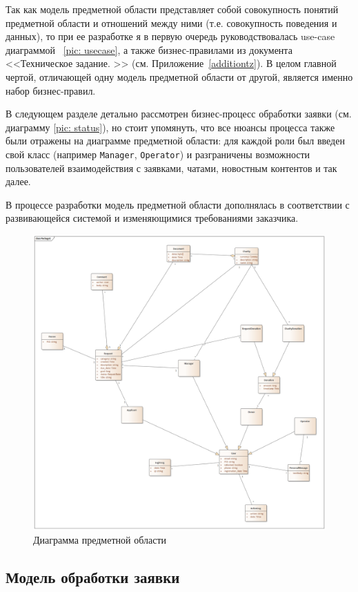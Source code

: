 \documentclass[a4paper,12pt,reqno]{article}
\begin{document}
Так как модель предметной области представляет собой совокупность понятий предметной области и отношений между ними (т.е. совокупность поведения и данных), то при ее разработке я в первую очередь руководствовалась use-case диаграммой~ \ref{pic: usecase}, а также бизнес-правилами из документа <<Техническое задание. >> (см. Приложение~\ref{additiontz}). В целом главной чертой, отличающей одну модель предметной области от другой, является именно набор бизнес-правил.

В следующем разделе детально рассмотрен бизнес-процесс обработки заявки (см. диаграмму \ref{pic: status}), но стоит упомянуть, что все нюансы процесса также были отражены на диаграмме предметной области: для каждой роли был введен свой класс (например \texttt{Manager}, \texttt{Operator}) и разграничены возможности пользователей взаимодействия с заявками, чатами, новостным контентов и так далее.

В процессе разработки модель предметной области дополнялась в соответствии с развивающейся системой и изменяющимися требованиями заказчика. 

\begin{figure}[H]
		\centering
		\includegraphics[width = 0.9\linewidth]{img/domain.png}
		\caption{Диаграмма предметной области}
		\label{pic: domain}
\end{figure}

\subsection{Модель обработки заявки} \label{sec: bpmn_status}
\end{document}
